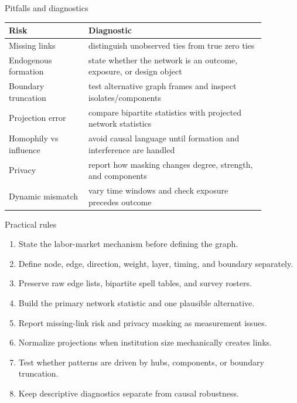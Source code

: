 \documentclass[aspectratio=169,11pt]{beamer}
\newcommand{\1}{\mathbf{1}}
\begin{document}
\begin{frame}{Pitfalls and diagnostics}
\small
\begin{tabular}{p{0.27\linewidth} p{0.60\linewidth}}
\toprule
Risk & Diagnostic \\
\midrule
Missing links & distinguish unobserved ties from true zero ties \\
Endogenous formation & state whether the network is an outcome, exposure, or design object \\
Boundary truncation & test alternative graph frames and inspect isolates/components \\
Projection error & compare bipartite statistics with projected network statistics \\
Homophily vs influence & avoid causal language until formation and interference are handled \\
Privacy & report how masking changes degree, strength, and components \\
Dynamic mismatch & vary time windows and check exposure precedes outcome \\
\bottomrule
\end{tabular}
\end{frame}

\begin{frame}{Practical rules}
\begin{enumerate}
    \item State the labor-market mechanism before defining the graph.
    \item Define node, edge, direction, weight, layer, timing, and boundary separately.
    \item Preserve raw edge lists, bipartite spell tables, and survey rosters.
    \item Build the primary network statistic and one plausible alternative.
    \item Report missing-link risk and privacy masking as measurement issues.
    \item Normalize projections when institution size mechanically creates links.
    \item Test whether patterns are driven by hubs, components, or boundary truncation.
    \item Keep descriptive diagnostics separate from causal robustness.
\end{enumerate}
\end{frame}
\end{document}
